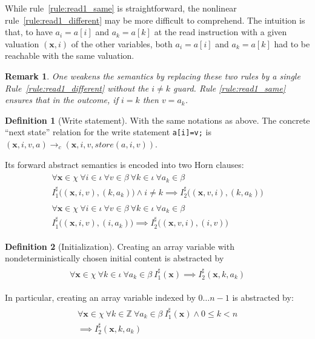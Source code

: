 \documentclass[a4paper]{article}
\newcommand{\ve}[1]{\mathbf{#1}}
\newcommand{\vx}{\ve{x}}
\newcommand{\ZZ}{\mathbb{Z}}
\newcommand{\abstr}[1]{#1^\sharp}
\theoremstyle{definition}
\newtheorem{definition}{Definition}
\theoremstyle{plain}
\newtheorem{remark}{Remark}
\newcommand{\rulespacing}{\\[0.4em]}
\begin{document}
While rule~\ref{rule:read1_same} is straightforward, the nonlinear rule~\ref{rule:read1_different} may be more difficult to comprehend. The intuition is that, to have $a_i = a[i]$ and $a_k = a[k]$ at the read instruction with a given valuation $(\vx,i)$ of the other variables, both $a_i = a[i]$ and $a_k = a[k]$ had to be reachable with the same valuation.

\begin{remark}
One weakens the semantics by replacing these two rules by a single Rule~\ref{rule:read1_different} without the $i \neq k$ guard. Rule \ref{rule:read1_same} ensures that in the outcome, if $i = k$ then $v = a_k$.
\end{remark}

\begin{definition}[Write statement]\label{def:write1}
With the same notations as above. 
The concrete ``next state'' relation for the write statement \lstinline|a[i]=v;| is
$(\vx,i,v,a) \rightarrow_c (\vx,i,v,\mathit{store}(a,i,v))$.

Its forward abstract semantics is encoded into two Horn clauses:
\begin{align}
\begin{aligned}
\forall \vx \in \chi~ \forall i \in \iota~ \forall v \in \beta~
  \forall k \in \iota~ \forall a_k \in \beta\\
  \abstr{I}_1\big((\vx,i,v),(k,a_k)\big) \land i\neq k \implies
  \abstr{I}_2\big((\vx,v,i),(k,a_k)\big)
\end{aligned}\label{rule:write1_different}\rulespacing
\begin{aligned}
\forall \vx \in \chi~ \forall i \in \iota~ \forall v \in \beta~
  \forall k \in \iota~ \forall a_k \in \beta\\
  \abstr{I}_1\big((\vx,i,v),(i,a_k)\big) \implies
  \abstr{I}_2\big((\vx,v,i),(i,v)\big)
\end{aligned}\label{rule:write1_same}
\end{align}
\end{definition}


\begin{definition}[Initialization]\label{def:initialization1}
Creating an array variable with nondeterministically chosen initial content is abstracted by
\begin{align}
\begin{aligned}
\forall \vx \in \chi~ \forall k \in \iota~ \forall a_k \in \beta~
  \abstr{I}_1(\vx) \implies
  \abstr{I}_2(\vx,k,a_k)
\end{aligned}
\end{align}

In particular, creating an array variable indexed by $0 \dots n-1$ is abstracted by:
\begin{align}
\begin{aligned}
\forall \vx \in \chi~ \forall k \in \ZZ~ \forall a_k \in \beta~
  \abstr{I}_1(\vx) \land 0 \leq k < n \\ \implies
  \abstr{I}_2(\vx,k,a_k)
\end{aligned}
\end{align}
\end{definition}
\end{document}
